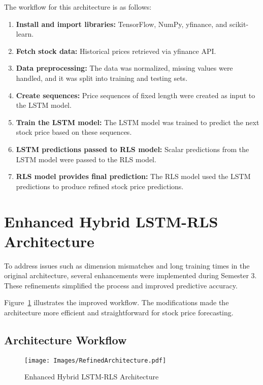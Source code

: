 The workflow for this architecture is as follows:
\begin{enumerate}
    \item \textbf{Install and import libraries:} TensorFlow, NumPy, yfinance, and scikit-learn.
    \item \textbf{Fetch stock data:} Historical prices retrieved via yfinance API.
    \item \textbf{Data preprocessing:} The data was normalized, missing values were handled, and it was split into training and testing sets.
    \item \textbf{Create sequences:} Price sequences of fixed length were created as input to the LSTM model.
    \item \textbf{Train the LSTM model:} The LSTM model was trained to predict the next stock price based on these sequences.
    \item \textbf{LSTM predictions passed to RLS model:} Scalar predictions from the LSTM model were passed to the RLS model.
    \item \textbf{RLS model provides final prediction:} The RLS model used the LSTM predictions to produce refined stock price predictions.
\end{enumerate}

\section{Enhanced Hybrid LSTM-RLS Architecture}

To address issues such as dimension mismatches and long training times in the original architecture, several enhancements were implemented during Semester 3. These refinements simplified the process and improved predictive accuracy.

Figure~\ref{fig:Refinedarch} illustrates the improved workflow. The modifications made the architecture more efficient and straightforward for stock price forecasting.

\subsection{Architecture Workflow}

\begin{figure}[htbp]
    \centering
    \texttt{[image: Images/RefinedArchitecture.pdf]} %
    \caption{Enhanced Hybrid LSTM-RLS Architecture}
    \label{fig:Refinedarch}
\end{figure}

